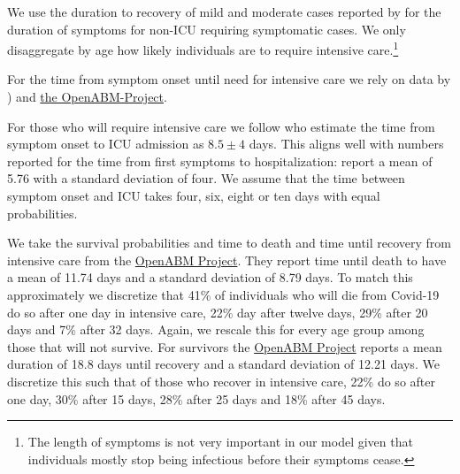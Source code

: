 
We use the duration to recovery of mild and moderate cases reported by \cite[Figure~S3,
Panel~2]{Bi2020} for the duration of symptoms for non-ICU requiring symptomatic cases. We
only disaggregate by age how likely individuals are to require intensive
care.\footnote{The length of symptoms is not very important in our model given that
individuals mostly stop being infectious before their symptoms cease.}


For the time from symptom onset until need for intensive care we rely on data by
\cite{Stokes2020}) and \href{https://bit.ly/3yKXFyu}{the OpenABM-Project}.

For those who will require intensive care we follow \citet{Chen2020} who estimate the
time from symptom onset to ICU admission as $8.5 \pm 4$ days. This aligns well with
numbers reported for the time from first symptoms to hospitalization:
\citet{Gaythorpe2020} report a mean of 5.76 with a standard deviation of four. We assume
that the time between symptom onset and ICU takes four, six, eight or ten days with equal
probabilities.


We take the survival probabilities and time to death and time until recovery from
intensive care from the \href{https://tinyurl.com/y5owhyts}{OpenABM Project}. They report
time until death to have a mean of 11.74 days and a standard deviation of 8.79 days. To
match this approximately we discretize that 41\% of individuals who will die from
Covid-19 do so after one day in intensive care, 22\% day after twelve days, 29\% after 20
days and 7\% after 32 days. Again, we rescale this for every age group among those that
will not survive. For survivors the \href{https://tinyurl.com/y5owhyts}{OpenABM Project}
reports a mean duration of 18.8 days until recovery and a standard deviation of 12.21
days. We discretize this such that of those who recover in intensive care, 22\% do so
after one day, 30\% after 15 days, 28\% after 25 days and 18\% after 45 days.

\FloatBarrier
